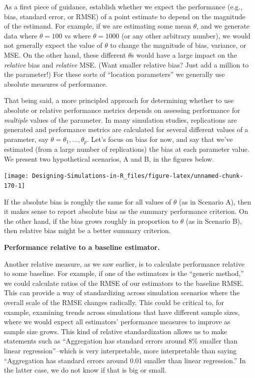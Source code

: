 \documentclass[
]{book}
\begin{document}
As a first piece of guidance, establish whether we expect the performance (e.g., bias, standard error, or RMSE) of a point estimate to depend on the magnitude of the estimand.
For example, if we are estimating some mean \(\theta\), and we generate data where \(\theta = 100\) vs where \(\theta = 1000\) (or any other arbitrary number), we would not generally expect the value of \(\theta\) to change the magnitude of bias, variance, or MSE.
On the other hand, these different \(\theta\)s would have a large impact on the \emph{relative} bias and \emph{relative} MSE.
(Want smaller relative bias? Just add a million to the parameter!)
For these sorts of ``location parameters'' we generally use absolute measures of performance.

That being said, a more principled approach for determining whether to use absolute or relative performance metrics depends on assessing performance for \emph{multiple} values of the parameter.
In many simulation studies, replications are generated and performance metrics are calculated for several different values of a parameter, say \(\theta = \theta_1,...,\theta_p\).
Let's focus on bias for now, and say that we've estimated (from a large number of replications) the bias at each parameter value.
We present two hypothetical scenarios, A and B, in the figures below.

\begin{center}\texttt{[image: Designing-Simulations-in-R\_files/figure-latex/unnamed-chunk-170-1]} \end{center}

If the absolute bias is roughly the same for all values of \(\theta\) (as in Scenario A), then it makes sense to report absolute bias as the summary performance criterion.
On the other hand, if the bias grows roughly in proportion to \(\theta\) (as in Scenario B), then relative bias might be a better summary criterion.

\textbf{Performance relative to a baseline estimator.}

Another relative measure, as we saw earlier, is to calculate performance relative to some baseline.
For example, if one of the estimators is the ``generic method,'' we could calculate ratios of the RMSE of our estimators to the baseline RMSE.
This can provide a way of standardizing across simulation scenarios where the overall scale of the RMSE changes radically.
This could be critical to, for example, examining trends across simulations that have different sample sizes, where we would expect all estimators' performance measures to improve as sample size grows.
This kind of relative standardization allows us to make statements such as ``Aggregation has standard errors around 8\% smaller than linear regression''--which is very interpretable, more interpretable than saying ``Aggregation has standard errors around 0.01 smaller than linear regression.''
In the latter case, we do not know if that is big or small.
\end{document}
